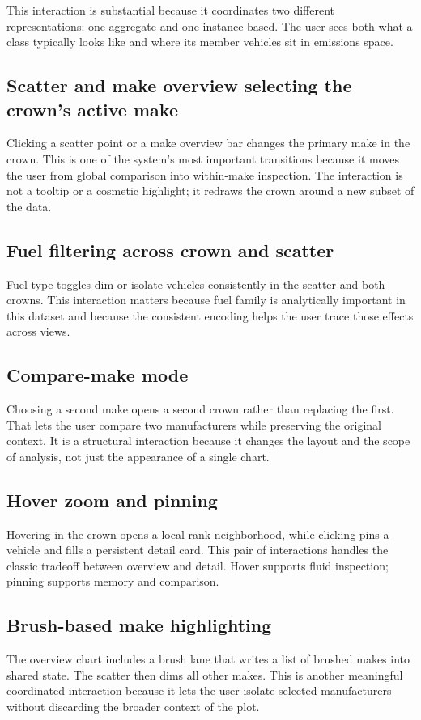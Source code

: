 \documentclass[12pt,letterpaper]{article}
\begin{document}
This interaction is substantial because it coordinates two different representations: one aggregate and one instance-based. The user sees both what a class typically looks like and where its member vehicles sit in emissions space.

\subsection*{Scatter and make overview selecting the crown's active make}
Clicking a scatter point or a make overview bar changes the primary make in the crown. This is one of the system's most important transitions because it moves the user from global comparison into within-make inspection. The interaction is not a tooltip or a cosmetic highlight; it redraws the crown around a new subset of the data.

\subsection*{Fuel filtering across crown and scatter}
Fuel-type toggles dim or isolate vehicles consistently in the scatter and both crowns. This interaction matters because fuel family is analytically important in this dataset and because the consistent encoding helps the user trace those effects across views.

\subsection*{Compare-make mode}
Choosing a second make opens a second crown rather than replacing the first. That lets the user compare two manufacturers while preserving the original context. It is a structural interaction because it changes the layout and the scope of analysis, not just the appearance of a single chart.

\subsection*{Hover zoom and pinning}
Hovering in the crown opens a local rank neighborhood, while clicking pins a vehicle and fills a persistent detail card. This pair of interactions handles the classic tradeoff between overview and detail. Hover supports fluid inspection; pinning supports memory and comparison.

\subsection*{Brush-based make highlighting}
The overview chart includes a brush lane that writes a list of brushed makes into shared state. The scatter then dims all other makes. This is another meaningful coordinated interaction because it lets the user isolate selected manufacturers without discarding the broader context of the plot.
\end{document}
